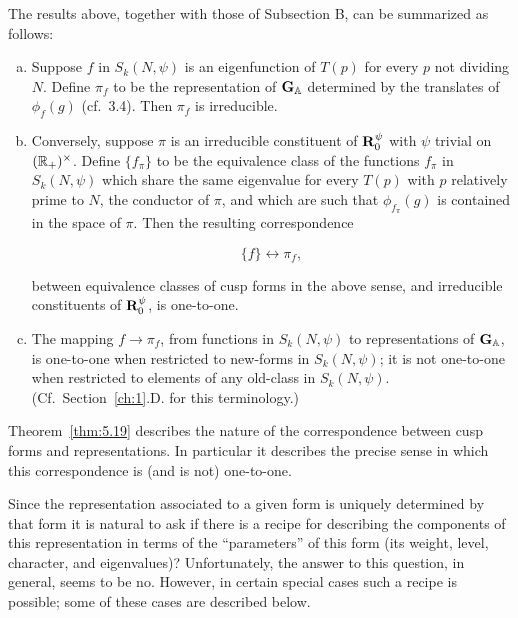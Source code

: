 The results above, together with those of Subsection B, can be summarized as follows:

\begin{theorem}\label{thm:5.19}

\begin{enumerate}[(a)]

\item Suppose $f$ in $S_k(N, \psi)$ is an eigenfunction of $T(p)$ for every $p$ not dividing $N$. Define $\pi_f$ to be the representation of $\mathbf{G}_{\mathbb{A}}$ determined by the translates of $\phi_f(g)$ (cf.\ 3.4). Then $\pi_f$ is irreducible.

\item Conversely, suppose $\pi$ is an irreducible constituent of $\mathbf{R}_0^{\psi}$ with $\psi$ trivial on $(\mathbb{R}_+)^{\times}$. Define $\{f_{\pi}\}$ to be the equivalence class of the functions $f_{\pi}$ in $S_k(N,\psi)$ which share the same eigenvalue for every $T(p)$ with $p$ relatively prime to $N$, the conductor of $\pi$, and which are such that $\phi_{f_{\pi}}(g)$ is contained in the space of $\pi$. Then the resulting correspondence

\[
\{f\} \leftrightarrow \pi_f,
\]

between equivalence classes of cusp forms in the above sense, and irreducible constituents of $\mathbf{R}_0^{\psi}$, is one-to-one.

\item The mapping $f \to \pi_f$, from functions in $S_k(N, \psi)$ to representations of $\mathbf{G}_{\mathbb{A}}$, is one-to-one when restricted to new-forms in $S_k(N, \psi)$; it is not one-to-one when restricted to elements of any old-class in $S_k(N, \psi)$. (Cf.\ Section~\ref{ch:1}.D. for this terminology.)

\end{enumerate}

\end{theorem}

\begin{remark}\label{rem:5.20}

Theorem~\ref{thm:5.19} describes the nature of the correspondence between cusp forms and representations. In particular it describes the precise sense in which this correspondence is (and is not) one-to-one.

\end{remark}

Since the representation associated to a given form is uniquely determined by that form it is natural to ask if there is a recipe for describing the components of this representation in terms of the ``parameters'' of this form (its weight, level, character, and eigenvalues)? Unfortunately, the answer to this question, in general, seems to be no. However, in certain special cases such a recipe is possible; some of these cases are described below.

